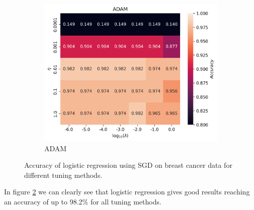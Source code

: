 \documentclass[11pt]{article}
\begin{document}
\begin{figure}[H]
\begin{subfigure}{.95\textwidth}
        \centering
        \includegraphics[width=.5\textwidth]{../figures/logreg_ADAM.png}
        \caption{ADAM}
        \label{fig:}
    \end{subfigure}
    \caption{Accuracy of logistic regression using SGD on breast cancer data for different tuning methods.}
    \label{fig:logreg_comp}
\end{figure}
In figure \ref{fig:logreg_comp} we can clearly see that logistic regression gives good results reaching an accuracy of up to 98.2\% for all tuning methods.
\end{document}

